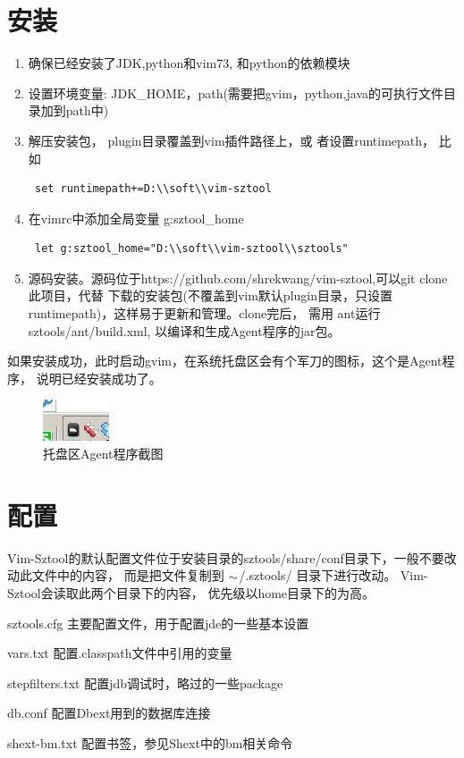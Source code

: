 \documentclass[oneside,openany]{book}
\begin{document}
  \section{安装}
    \begin{enumerate}
      \item 确保已经安装了JDK,python和vim73, 和python的依赖模块
      \item 设置环境变量: JDK\_HOME，path(需要把gvim，python,java的可执行文件目录加到path中)
      \item 解压安装包， plugin目录覆盖到vim插件路径上，或
      者设置runtimepath， 比如
      \begin{verbatim} set runtimepath+=D:\\soft\\vim-sztool \end{verbatim}
      \item 在vimrc中添加全局变量 g:sztool\_home
      \begin{verbatim} let g:sztool_home="D:\\soft\\vim-sztool\\sztools" \end{verbatim}
      \item 源码安装。源码位于https://github.com/shrekwang/vim-sztool,可以git clone此项目，代替
      下载的安装包(不覆盖到vim默认plugin目录，只设置runtimepath)，这样易于更新和管理。clone完后，
      需用 ant运行sztools/ant/build.xml, 以编译和生成Agent程序的jar包。
    \end{enumerate}
   如果安装成功，此时启动gvim，在系统托盘区会有个军刀的图标，这个是Agent程序，
   说明已经安装成功了。

   \begin{figure}[htbp]%
      \centering
      \includegraphics[scale=0.8]{tray.jpg}
      \caption{托盘区Agent程序截图}
  \end{figure}

  \section{配置}
    Vim-Sztool的默认配置文件位于安装目录的sztools/share/conf目录下，一般不要改动此文件中的内容，
  而是把文件复制到 $\tiny{\sim}$/.sztools/ 目录下进行改动。 Vim-Sztool会读取此两个目录下的内容，
  优先级以home目录下的为高。
  \begin{description}
    \item{sztools.cfg} 主要配置文件，用于配置jde的一些基本设置
    \item{vars.txt} 配置.classpath文件中引用的变量
    \item{stepfilters.txt} 配置jdb调试时，略过的一些package
    \item{db.conf} 配置Dbext用到的数据库连接
    \item{shext-bm.txt} 配置书签，参见Shext中的bm相关命令
  \end{description}
  
\end{document}
